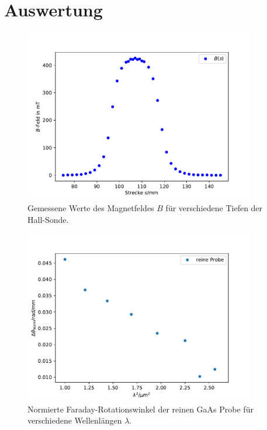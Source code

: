 \section{Auswertung}
\label{sec:auswertung}





\begin{figure}
  \centering
  \includegraphics[width = 0.9\textwidth]{Plots/B.pdf}
  \caption{Gemessene Werte des Magnetfeldes $B$ für verschiedene Tiefen der Hall-Sonde.}
  \label{fig:B}
\end{figure}

\begin{figure}
  \centering
  \includegraphics[width = 0.9\textwidth]{Plots/hr_GaAs.pdf}
  \caption{Normierte Faraday-Rotationswinkel der reinen GaAs Probe für verschiedene Wellenlängen $\lambda$.}
  \label{fig:hr}
\end{figure}

